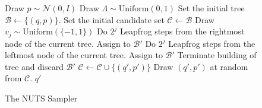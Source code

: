 \begin{figure}
	\begin{algorithm}[H]
	\caption{The NUTS Sampler}\label{algo:nuts}
	\begin{algorithmic}
            \State Draw $p \sim \mathcal{N}(0, I)$
            \State Draw $\Lambda \sim \text{Uniform}(0, 1)$
            \State Set the initial tree $\mathcal{B} \gets \{(q, p)\}$.
            \State Set the initial candidate set $\mathcal{C} \gets \mathcal{B}$
                \State Draw $v_j \sim \text{Uniform}(\{-1, 1\})$
                    \State Do $2^j$ Leapfrog steps from the rightmost node of the current tree. Assign to $\mathcal{B}'$
                \Else
                    \State Do $2^j$ Leapfrog steps from the leftmost node of the current tree. Assign to $\mathcal{B}'$
                \EndIf
                    \State Terminate building of tree and discard $\mathcal{B}'$
                \EndIf
            \EndFor
                \If{$\exp\{-[H(q',p') - H(q, p)]\} > \Lambda$}
                    \State $\mathcal{C} \gets \mathcal{C} \cup \{(q', p')\}$
                \EndIf
            \EndFor
            \State Draw $(q', p')$ at random from $\mathcal{C}$.
            \State \Return $q'$
        \EndFunction
	\end{algorithmic}
	\end{algorithm}
\end{figure}

